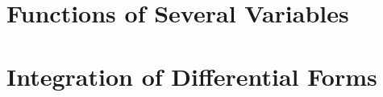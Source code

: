 \documentclass{report}
\begin{document}
\chapter{Functions of Several Variables}
\chapter{Integration of Differential Forms}
\end{document}
